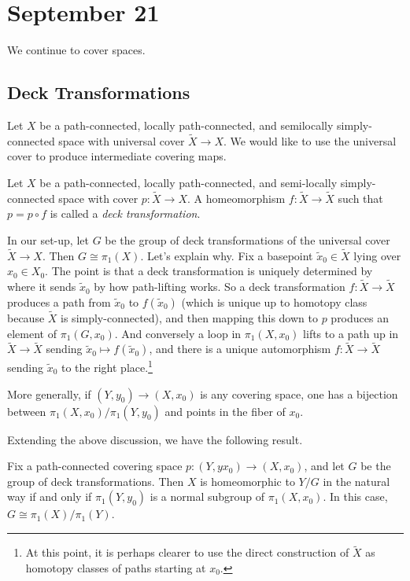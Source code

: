 \documentclass[../notes.tex]{subfiles}
\begin{document}
\section{September 21}

We continue to cover spaces.

\subsection{Deck Transformations}
Let $X$ be a path-connected, locally path-connected, and semilocally simply-connected space with universal cover $\widetilde X\to X$. We would like to use the universal cover to produce intermediate covering maps.
\begin{definition}
	Let $X$ be a path-connected, locally path-connected, and semi-locally simply-connected space with cover $p\colon\widetilde X\to X$. A homeomorphism $f\colon\widetilde X\to\widetilde X$ such that $p=p\circ f$ is called a \textit{deck transformation}.
\end{definition}
In our set-up, let $G$ be the group of deck transformations of the universal cover $\widetilde X\to X$. Then $G\cong\pi_1(X)$. Let's explain why. Fix a basepoint $\widetilde x_0\in\widetilde X$ lying over $x_0\in X_0$. The point is that a deck transformation is uniquely determined by where it sends $\widetilde x_0$ by how path-lifting works. So a deck transformation $f\colon\widetilde X\to\widetilde X$ produces a path from $\widetilde x_0$ to $f(\widetilde x_0)$ (which is unique up to homotopy class because $\widetilde X$ is simply-connected), and then mapping this down to $p$ produces an element of $\pi_1(G,x_0)$. And conversely a loop in $\pi_1(X,x_0)$ lifts to a path up in $\widetilde X\to\widetilde X$ sending $\widetilde x_0\mapsto f(\widetilde x_0)$, and there is a unique automorphism $f\colon\widetilde X\to\widetilde X$ sending $\widetilde x_0$ to the right place.\footnote{At this point, it is perhaps clearer to use the direct construction of $\widetilde X$ as homotopy classes of paths starting at $x_0$.}
\begin{remark}
	More generally, if $(Y,y_0)\to (X,x_0)$ is any covering space, one has a bijection between $\pi_1(X,x_0)/\pi_1(Y,y_0)$ and points in the fiber of $x_0$.
\end{remark}
Extending the above discussion, we have the following result.
\begin{theorem}
	Fix a path-connected covering space $p\colon(Y,yx_0)\to (X,x_0)$, and let $G$ be the group of deck transformations. Then $X$ is homeomorphic to $Y/G$ in the natural way if and only if $\pi_1(Y,y_0)$ is a normal subgroup of $\pi_1(X,x_0)$. In this case, $G\cong\pi_1(X)/\pi_1(Y)$.
\end{theorem}
\end{document}
